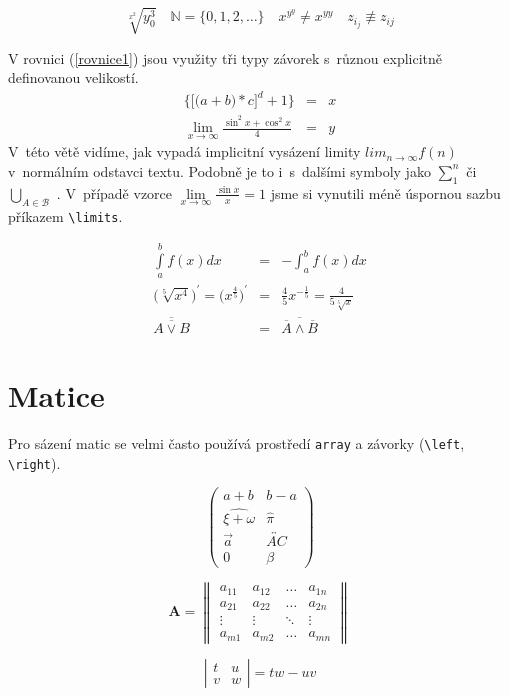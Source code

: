 \documentclass[a4paper, 11pt, twocolumn]{article}
\begin{document}
$$\sqrt[x^2]{y^3_0} \quad \mathbb{N}=\{ 0,1,2,\ldots \} \quad x^{y^y} \neq x^{yy} \quad z_{i_j} \not\equiv z_{ij}$$

V rovnici (\ref{rovnice1}) jsou využity tři typy závorek s~různou explicitně definovanou velikostí.
\begin{eqnarray}
\bigg\{ \Big[\big(a+b\big)*c\Big]^d + 1\bigg\} & = & x \label{rovnice1} \\
\lim_{x\to\infty} \frac{\sin^2 x + \cos^2 x}{4} & = & y \nonumber
\end{eqnarray}
V~této větě vidíme, jak vypadá implicitní vysázení limity $lim_{n\to\infty} f(n)$ v~normálním odstavci textu. Podobně je to i~s~dalšími symboly jako $\sum_{1}^n$ či $\bigcup_{A\in \mathcal{B}}$ . V~případě vzorce $\lim\limits_{x\to\infty} \frac{\sin x}{x} = 1$ jsme si vynutili méně úspornou sazbu příkazem \verb|\limits|.

\begin{eqnarray}
\int\limits_a^b f(x)dx & = & - \int_a^b f(x)dx \\
\Big(\sqrt[5]{x^4}\Big)^{'} = \Big(x^{\frac{4}{5}}\Big)^{'} & = & \frac{4}{5}x^{-\frac{1}{5}}=\frac{4}{5\sqrt[5]{x}} \\
\overline{\overline{A \vee B}} & = & \overline{\overline{A} \wedge \overline{B}}
\end{eqnarray}

\section{Matice}
Pro sázení matic se velmi často používá prostředí \texttt{array} a závorky (\verb|\left|, \verb|\right|). 

$$\left( \begin{array}{cc}
a+b & b-a \\
\widehat{\xi + \omega} & \hat{\pi} \\
\vec{a} & \overleftrightarrow{AC} \\
0 & \beta
\end{array}\right)$$

$$\mathbf{A} = \left\| \begin{array}{cccc}
a_{11} & a_{12} & \ldots & a_{1n} \\
a_{21} & a_{22} & \ldots & a_{2n} \\
\vdots & \vdots & \ddots & \vdots \\
a_{m1} & a_{m2} & \ldots & a_{mn}
\end{array}\right\|$$

$$\left| \begin{array}{cc}
t & u \\
v & w
\end{array}\right| = tw - uv$$
\end{document}
